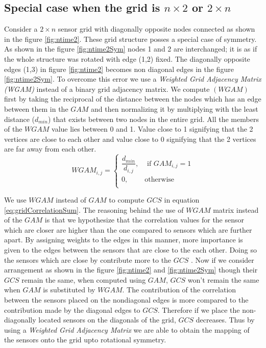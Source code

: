 \subsection{Special case when the grid is $n \times 2$ or $2 \times n$}
Consider a $2 \times n$ sensor grid with diagonally opposite nodes connected as shown in the figure \ref{fig:ntime2}. These grid structure posses a special case of symmetry. As shown in the  figure \ref{fig:ntime2Sym} nodes 1 and 2 are interchanged; it is as if the whole structure was rotated with  edge (1,2) fixed. The diagonally opposite edges (1,3) in figure \ref{fig:ntime2} becomes non diagonal edges in the figure \ref{fig:ntime2Sym}. To overcome this error we use a \textit{Weighted Grid Adjacency Matrix (WGAM)} instead of a binary grid adjacency matrix. We compute $(WGAM)$ first by taking the reciprocal of the distance between the nodes which has an edge between them in the $GAM$ and then normalizing it by multiplying with the least distance ($d_{min}$) that exists between two nodes in the entire grid. All the members of the $WGAM$ value lies between 0 and 1. Value close to 1 signifying that the 2 vertices are close to each other and value close to 0 signifying that the 2 vertices are far away from each other.\\
\[
WGAM_{i,j} = 
\begin{cases}
\dfrac{d_{min}}{d_{i,j}}, &\text{ if } GAM_{i,j} = 1\\
0, & \text{otherwise}\\
\end{cases}
\]


We use $WGAM$ instead of $GAM$ to compute $GCS$ in equation \ref{eq:gridCorrelationSum}. The reasoning behind the use of $WGAM$ matrix instead of the $GAM$ is that we hypothesize that the correlation values for the sensor which are closer are higher than the one compared to sensors which are further apart. By assigning weights to the edges in this manner, more importance is given to the edges between the sensors that are close to the each other. Doing so the sensors which are close by contribute  more to the $GCS$ . 
Now if we consider arrangement as shown in the figure \ref{fig:ntime2} and \ref{fig:ntime2Sym} though their $GCS$ remain the same, when computed using $GAM$, $GCS$ won't remain the same when $GAM$ is substituted by $WGAM$. The contribution of the correlation between the sensors placed on the nondiagonal edges is more compared to the contribution made by the diagonal edges to $GCS$. Therefore if we place the non-diagonally located sensors on the diagonals of the grid, $GCS$ decreases. Thus by using a \textit{Weighted Grid Adjacency Matrix} we are able to obtain the mapping of the sensors onto the grid upto rotational symmetry.

